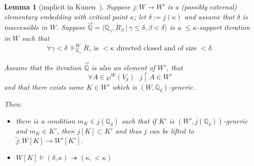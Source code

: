 \documentclass{amsart}
\newtheorem{lemma}[theorem]{Lemma}
\begin{document}
\begin{lemma}[implicit in Kunen~\cite{MR495118}]
Suppose $j:W \to W'$ is a (possibly external) elementary embedding with critical point $\kappa$; let $\delta:= j(\kappa)$ and assume that $\delta$ is inaccessible in $W$.  Suppose $\vec{\mathbb{Q}} = \langle \mathbb{Q}_\gamma, \dot{R}_\beta \ | \ \gamma \le \delta, \beta < \delta \rangle$ is a $\le \kappa$-support iteration in $W$ such that
\begin{equation}
\forall \gamma < \delta \ \Vdash^W_{\mathbb{Q}_\gamma} \dot{R}_\gamma \text{ is } < \kappa \text{ directed closed and of size } < \delta.
\end{equation}

Assume that the iteration $\vec{\mathbb{Q}}$ is also an element of $W'$, that  
\begin{equation}
\forall A \in \wp^W(V_\delta) \ \ \  j \restriction A \in W'
\end{equation}
and that there exists some $K \in W'$ which is $(W,\mathbb{Q}_\delta)$-generic.

Then:
\begin{itemize}
 \item there is a condition $m_K \in j(\mathbb{Q}_\delta)$ such that if $K'$ is $(W',j(\mathbb{Q}_\delta))$-generic and $m_K \in K'$, then $j[K] \subset K'$ and thus $j$ can be lifted to $\tilde{j}: W[K] \to W'[K']$.
 \item $W[K] \models (\delta, \kappa) \twoheadrightarrow (\kappa, < \kappa)$
\end{itemize} 
\end{lemma}
\end{document}
